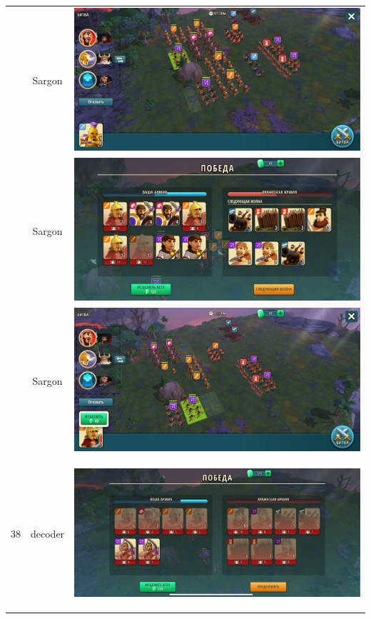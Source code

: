 \begin{longtable}{|c|c|c|}
	& Sargon &
	\includegraphics[width=0.75\linewidth]{./parts/media/TreasureHunt/38/sargon/photo_2022-04-07_13-17-20.jpg} \\
	& Sargon &
	\includegraphics[width=0.75\linewidth]{./parts/media/TreasureHunt/38/sargon/photo_2022-04-07_13-17-28.jpg} \\
	& Sargon &
	\includegraphics[width=0.75\linewidth]{./parts/media/TreasureHunt/38/sargon/photo_2022-04-07_13-17-31.jpg} \\
	\hline
	\multirow{8}{*}{38} & decoder &
	\hypertarget{fight38}{\includegraphics[width=0.75\linewidth]{./parts/media/TreasureHunt/38/decoder/photo_2022-04-07_10-10-23.jpg}} \\

\end{longtable}
